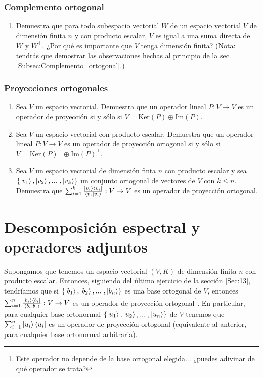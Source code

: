 \documentclass[12pt,dvipsnames]{article}
\begin{document}
\subsubsection{Complemento ortogonal} \label{Ejer:Complemento_ortogonal}
\begin{enumerate}
    \item Demuestra que para todo subespacio vectorial $W$ de un espacio vectorial $V$ de dimensión finita $n$ y con producto escalar, $V$ es igual a una suma directa de $W$ y $W^{\perp}.$ ¿Por qué es importante que $V$ tenga dimensión finita? (Nota: tendrás que demostrar las observaciones hechas al principio de la sec. \ref{Subsec:Complemento_ortogonal}.)
\end{enumerate}

\subsubsection{Proyecciones ortogonales} \label{Ejer:Proyecciones_ortogonales}
\begin{enumerate}
    \item Sea $V$ un espacio vectorial. Demuestra que un operador lineal $P:V\to V$ es un operador de proyección si y sólo si $V=\text{Ker}(P)\oplus\text{Im}(P)$.
    \item Sea $V$ un espacio vectorial con producto escalar. Demuestra que un operador lineal $P:V\to V$ es un operador de proyección ortogonal si y sólo si $V=\text{Ker}(P)^\perp\oplus\text{Im}(P)^\perp$.
    \item Sea $V$ un espacio vectorial de dimensión finta $n$ con producto escalar y sea $\{\ket{v_1},\ket{v_2},... \ ,\ket{v_k}\}$ un conjunto ortogonal de vectores de $V$ con $k\le n$. Demuestra que $\sum_{i=1}^k\frac{\ket{v_i}\bra{v_i}}{\braket{v_i|v_i}}:V\to V$ es un operador de proyección ortogonal.
\end{enumerate}

\newpage
\section{Descomposición espectral y operadores adjuntos} \label{Sec:14} 


Supongamos que tenemos un espacio vectorial $(V,K)$ de dimensión finita $n$ con producto escalar. Entonces, siguiendo del último ejercicio de la sección \ref{Sec:13}, tendríamos que si $\{\ket{b_1},\ket{b_2},... \ ,\ket{b_n}\}$ es una base ortogonal de $V$, entonces $\sum_{i=1}^n \frac{\ket{b_i}\bra{b_i}}{\braket{b_i|b_i}}:V\to V$ es un operador de proyección ortogonal\footnote{Este operador no depende de la base ortogonal elegida... ¿puedes adivinar de qué operador se trata?}. En particular, para cualquier base ortonormal $\{\ket{u_1},\ket{u_2},... \ ,\ket{u_n}\}$ de $V$ tenemos que $\sum_{i=1}^n\ket{u_i}\bra{u_i}$ es un operador de proyección ortogonal (equivalente al anterior, para cualquier base ortonormal arbitraria).
\end{document}
